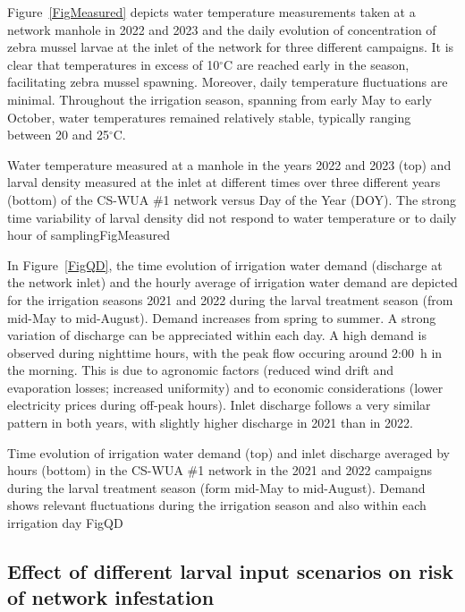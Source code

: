 \documentclass[review,authoryear]{elsarticle}
\begin{document}
Figure~\ref{FigMeasured} depicts water temperature measurements taken at a
network manhole in 2022 and 2023 and the daily evolution of concentration of
zebra mussel larvae at the inlet of the network for three different campaigns.
It is clear that temperatures in excess of 10$^\circ$C are reached early in the
season, facilitating zebra mussel spawning. Moreover, daily temperature
fluctuations are minimal. Throughout the irrigation season, spanning from early
May to early October, water temperatures remained relatively stable, typically
ranging between 20 and 25$^\circ$C.

{Water temperature measured at a manhole in the years 2022 and 2023 (top) and
larval density measured at the inlet at different times over three different
years (bottom) of the CS-WUA \#1 network versus Day of the Year (DOY). The
strong time variability of larval density did not respond to water temperature
or to daily hour of sampling}{FigMeasured}

In Figure~\ref{FigQD}, the time evolution of irrigation water demand (discharge
at the network inlet) and the hourly average of irrigation water demand are
depicted for the irrigation seasons 2021 and 2022 during the larval
treatment season (from mid-May to mid-August). Demand increases from spring to
summer. A strong variation of discharge can be appreciated within each day. A
high demand is observed during nighttime hours, with the peak flow occuring
around 2:00~h in the morning. This is due to agronomic factors (reduced wind
drift and evaporation losses; increased uniformity) and to economic
considerations (lower electricity prices during off-peak hours). Inlet discharge
follows a very similar pattern in both years, with slightly higher discharge in
2021 than in 2022.

{Time evolution of irrigation water demand (top) and inlet discharge averaged by
hours (bottom) in the CS-WUA \#1 network in the 2021 and 2022 campaigns during
the larval treatment season (form mid-May to mid-August). Demand shows relevant
fluctuations during the irrigation season and also within each irrigation day}
{FigQD}

\subsection{Effect of different larval input scenarios on risk of network
	infestation}
\end{document}
